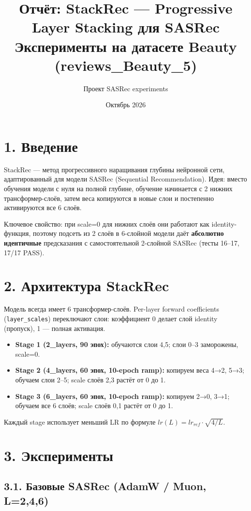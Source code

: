 \documentclass[11pt,a4paper]{article}
\title{\textbf{Отчёт: StackRec — Progressive Layer Stacking для SASRec}\\
\large Эксперименты на датасете Beauty (reviews\_Beauty\_5)}
\author{Проект SASRec experiments}
\date{Октябрь 2026}
\begin{document}
\maketitle

\section*{1. Введение}

StackRec — метод прогрессивного наращивания глубины нейронной сети,
адаптированный для модели SASRec (Sequential Recommendation).
Идея: вместо обучения модели с нуля на полной глубине, обучение
начинается с 2 нижних трансформер-слоёв, затем веса копируются
в новые слои и постепенно активируются все 6 слоёв.

Ключевое свойство: при scale=0 для нижних слоёв они работают как
identity-функция, поэтому подсеть из 2 слоёв в 6-слойной модели
даёт \textbf{абсолютно идентичные} предсказания с самостоятельной
2-слойной SASRec (тесты 16--17, 17/17 PASS).

\section*{2. Архитектура StackRec}

Модель всегда имеет 6 трансформер-слоёв. Per-layer forward coefficients
(\texttt{layer\_scales}) переключают слои: коэффициент 0 делает слой
identity (пропуск), 1 — полная активация.

\begin{itemize}
  \item \textbf{Stage 1 (2\_layers, 90 эпох):} обучаются слои 4,5;
        слои 0--3 заморожены, scale=0.
  \item \textbf{Stage 2 (4\_layers, 60 эпох, 10-epoch ramp):}
        копируем веса 4→2, 5→3; обучаем слои 2--5;
        scale слоёв 2,3 растёт от 0 до 1.
  \item \textbf{Stage 3 (6\_layers, 60 эпох, 10-epoch ramp):}
        копируем 2→0, 3→1; обучаем все 6 слоёв;
        scale слоёв 0,1 растёт от 0 до 1.
\end{itemize}

Каждый stage использует меньший LR по формуле $lr(L) = lr_{ref} \cdot \sqrt{4/L}$.

\section*{3. Эксперименты}

\subsection*{3.1. Базовые SASRec (AdamW / Muon, L=2,4,6)}
\end{document}
